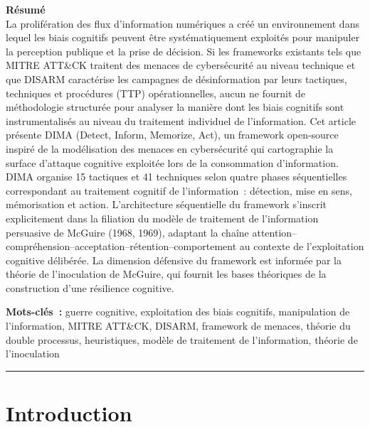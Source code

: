 \documentclass[11pt,a4paper]{article}
\begin{document}
\begin{center}
\parbox{0.92\textwidth}{
\textbf{\large R\'esum\'e}\\[6pt]
\small
La prolif\'eration des flux d'information num\'eriques a cr\'e\'e un environnement dans lequel les biais cognitifs peuvent \^etre syst\'ematiquement exploit\'es pour manipuler la perception publique et la prise de d\'ecision. Si les frameworks existants tels que MITRE ATT\&CK traitent des menaces de cybers\'ecurit\'e au niveau technique et que DISARM caract\'erise les campagnes de d\'esinformation par leurs tactiques, techniques et proc\'edures (TTP) op\'erationnelles, aucun ne fournit de m\'ethodologie structur\'ee pour analyser la mani\`ere dont les biais cognitifs sont instrumentalis\'es au niveau du traitement individuel de l'information. Cet article pr\'esente DIMA (Detect, Inform, Memorize, Act), un framework open-source inspir\'e de la mod\'elisation des menaces en cybers\'ecurit\'e qui cartographie la surface d'attaque cognitive exploit\'ee lors de la consommation d'information. DIMA organise 15 tactiques et 41 techniques selon quatre phases s\'equentielles correspondant au traitement cognitif de l'information~: d\'etection, mise en sens, m\'emorisation et action. L'architecture s\'equentielle du framework s'inscrit explicitement dans la filiation du mod\`ele de traitement de l'information persuasive de McGuire (1968, 1969), adaptant la cha\^ine attention--compr\'ehension--acceptation--r\'etention--comportement au contexte de l'exploitation cognitive d\'elib\'er\'ee. La dimension d\'efensive du framework est inform\'ee par la th\'eorie de l'inoculation de McGuire, qui fournit les bases th\'eoriques de la construction d'une r\'esilience cognitive.

\vspace{6pt}
\textbf{Mots-cl\'es~:} guerre cognitive, exploitation des biais cognitifs, manipulation de l'information, MITRE ATT\&CK, DISARM, framework de menaces, th\'eorie du double processus, heuristiques, mod\`ele de traitement de l'information, th\'eorie de l'inoculation
}

\vspace{0.4cm}
\rule{\textwidth}{0.2pt}
\vspace{0.6cm}

\end{center}

\twocolumn

\section{Introduction}
\end{document}

